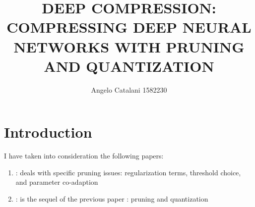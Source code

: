 \documentclass[journal]{vgtc}                %
\title{DEEP COMPRESSION: COMPRESSING DEEP NEURAL NETWORKS WITH PRUNING AND QUANTIZATION}
\author{Angelo Catalani 1582230}
\begin{document}

\maketitle
\section{Introduction}
I have taken into consideration the following papers:
\begin{enumerate}
\item \cite{p1} : deals with specific pruning issues: regularization terms, threshold choice, and  parameter co-adaption
\item \cite{p2} : is the sequel of the previous paper : pruning and quantization
\end{enumerate}
\end{document}
